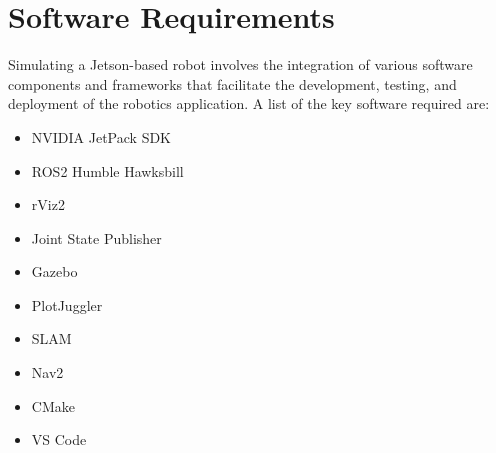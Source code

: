 \section{\fontsize{14}{16} Software Requirements}
{
	\fontsize{12}{14}
	Simulating a Jetson-based robot involves the integration of various software components and
	frameworks that facilitate the development, testing, and deployment of the robotics application.
	A list of the key software required are:
	
	\begin{itemize}
		\item NVIDIA JetPack SDK
		
		\item ROS2 Humble Hawksbill
		
		\item rViz2
		
		\item Joint State Publisher
		
		\item Gazebo
		
		\item PlotJuggler
		
		\item SLAM
		
		\item Nav2
		
		\item CMake
		
		\item VS Code
	\end{itemize}
		
}

